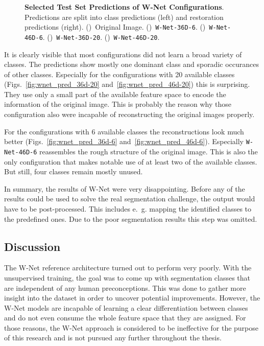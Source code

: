 \begin{figure}[h]
    \caption[Selected Test Set Predictions of W-Net Configurations]
    {\textbf{Selected Test Set Predictions of W-Net Configurations}. Predictions are split into class predictions (left) and restoration predictions (right).
    ()~Original Image.
    ()~\texttt{W-Net-36D-6}.
    ()~\texttt{W-Net-46D-6}.
    ()~\texttt{W-Net-36D-20}.
    ()~\texttt{W-Net-46D-20}.}
    \label{fig:wnet_prediction_images}
\end{figure}

It is clearly visible that most configurations did not learn a broad variety of classes. The predictions show mostly one dominant class and sporadic occurances of other classes. Especially for the configurations with 20 available classes (Figs.~\ref{fig:wnet_pred_36d-20} and~\ref{fig:wnet_pred_46d-20}) this is surprising. They use only a small part of the available feature space to encode the information of the original image. This is probably the reason why those configuration also were incapable of reconstructing the original images properly.

For the configurations with 6 available classes the reconstructions look much better (Figs.~\ref{fig:wnet_pred_36d-6} and~\ref{fig:wnet_pred_46d-6}). Especially \texttt{W-Net-46D-6} reassembles the rough structure of the original image. This is also the only configuration that makes notable use of at least two of the available classes. But still, four classes remain mostly unused.

In summary, the results of W-Net were very disappointing. Before any of the results could be used to solve the real segmentation challenge, the output would have to be post-processed. This includes e.~g. mapping the identified classes to the predefined ones. Due to the poor segmentation results this step was omitted.

\subsection{Discussion}
\label{sec:segmentation_discussion}
The W-Net reference architecture turned out to perform very poorly. With the unsupervised training, the goal was to come up with segmentation classes that are independent of any human preconceptions. This was done to gather more insight into the dataset in order to uncover potential improvements. However, the W-Net models are incapable of learning a clear differentiation between classes and do not even consume the whole feature space that they are assigned. For those reasons, the W-Net approach is considered to be ineffective for the purpose of this research and is not pursued any further throughout the thesis.

